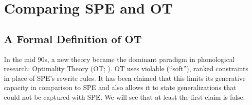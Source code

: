 \section{Comparing SPE and OT}

\subsection{A Formal Definition of OT}
In the mid 90s, a new theory became the dominant paradigm in phonological research: Optimality Theory (OT; \citealp{PrinceSmolensky04}).
OT uses violable (``soft''), ranked constraints in place of SPE's rewrite rules.
It has been claimed that this limits its generative capacity in comparison to SPE and also allows it to state generalizations that could not be captured with SPE\@.
We will see that at least the first claim is false.

